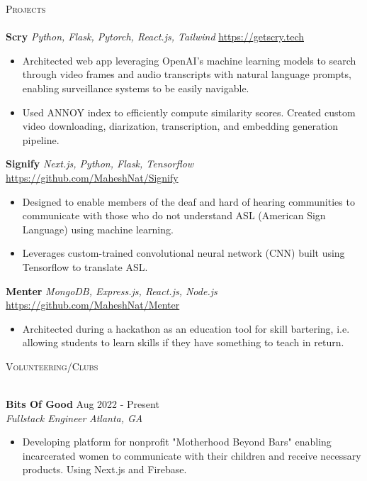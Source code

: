 \documentclass[a4paper]{article}
\newcommand{\lineunder} {
    \vspace*{-8pt} \\
    \hspace*{-18pt} \hrulefill \\
}
\newcommand{\header} [1] {
    {\hspace*{-18pt}\vspace*{6pt} \textsc{#1}}
    \vspace*{-6pt} \lineunder
}
\begin{document}
\header{Projects}
\vspace*{1mm}
{\textbf{Scry}} {\sl Python, Flask, Pytorch, React.js, Tailwind} \hfill \url{https://getscry.tech} \\
\begin{itemize} \itemsep -1pt
	\item Architected web app leveraging OpenAI's machine learning models to search through video frames and audio transcripts with natural language prompts, enabling surveillance systems to be easily navigable.
        \item Used ANNOY index to efficiently compute similarity scores. Created custom video downloading, diarization, transcription, and embedding generation pipeline.
\end{itemize}
{\textbf{Signify}} {\sl Next.js, Python, Flask, Tensorflow} \hfill \url{https://github.com/MaheshNat/Signify}\\
\begin{itemize} \itemsep -1pt
	\item Designed to enable members of the deaf and hard of hearing communities to communicate with those who do not understand ASL (American Sign Language) using machine learning.
	\item Leverages custom-trained convolutional neural network (CNN) built using Tensorflow to translate ASL.
\end{itemize}
\vspace*{1mm}
{\textbf{Menter}} {\sl MongoDB, Express.js, React.js, Node.js} \hfill \url{https://github.com/MaheshNat/Menter}\\
\begin{itemize} \itemsep -1pt
	\item Architected during a hackathon as an education tool for skill bartering, i.e. allowing students to learn skills if they have something to teach in return.
\end{itemize}
\vspace*{1mm}

\header{Volunteering/Clubs}
\vspace{1mm}

\textbf{Bits Of Good} \hfill Aug 2022 - Present\\
\textit{Fullstack Engineer} \hfill \textit{Atlanta, GA} \\
\vspace{-1mm}
\begin{itemize} \itemsep -1pt
	\item Developing platform for nonprofit "Motherhood Beyond Bars" enabling incarcerated women to communicate with their children and receive necessary products. Using Next.js and Firebase.
\end{itemize}
\end{document}
